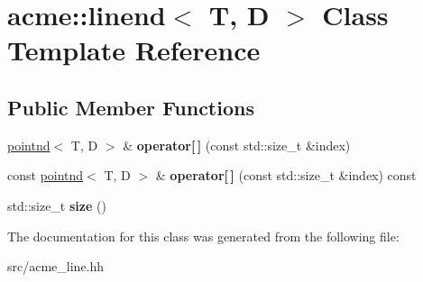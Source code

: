 \hypertarget{classacme_1_1linend}{}\section{acme\+:\+:linend$<$ T, D $>$ Class Template Reference}
\label{classacme_1_1linend}
\subsection*{Public Member Functions}
\begin{DoxyCompactItemize}
\item 
\mbox{\label{classacme_1_1linend_a65c3e459b2a2b4768edfd4e550efce70}} 
\hyperlink{classacme_1_1pointnd}{pointnd}$<$ T, D $>$ \& {\bfseries operator\mbox{[}$\,$\mbox{]}} (const std\+::size\+\_\+t \&index)
\item 
\mbox{\label{classacme_1_1linend_ac261d508a5222ae25402cab99e7befc5}} 
const \hyperlink{classacme_1_1pointnd}{pointnd}$<$ T, D $>$ \& {\bfseries operator\mbox{[}$\,$\mbox{]}} (const std\+::size\+\_\+t \&index) const
\item 
\mbox{\label{classacme_1_1linend_ae00237c0a82ba7022922ca99c386df60}} 
std\+::size\+\_\+t {\bfseries size} ()
\end{DoxyCompactItemize}


The documentation for this class was generated from the following file\+:\begin{DoxyCompactItemize}
\item 
src/acme\+\_\+line.\+hh\end{DoxyCompactItemize}
